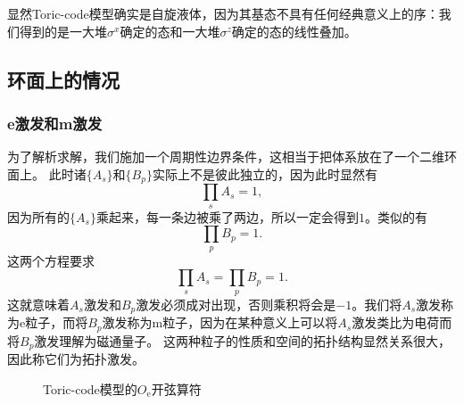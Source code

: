 显然Toric-code模型确实是自旋液体，因为其基态不具有任何经典意义上的序：我们得到的是一大堆$\sigma^x$确定的态和一大堆$\sigma^z$确定的态的线性叠加。

\subsection{环面上的情况}

\subsubsection{e激发和m激发}

为了解析求解，我们施加一个周期性边界条件，这相当于把体系放在了一个二维环面上。
此时诸$\{A_s\}$和$\{B_p\}$实际上不是彼此独立的，因为此时显然有
\[
    \prod_s {A}_s = 1,
\]
因为所有的$\{A_s\}$乘起来，每一条边被乘了两边，所以一定会得到$1$。类似的有
\[
    \prod_p {B}_p = 1.
\]
这两个方程要求
\begin{equation}
    \prod_{s} A_s = \prod_{p} B_p = 1.
    \label{eq:toric-code-pair-condition}
\end{equation}
这就意味着$A_s$激发和$B_p$激发必须成对出现，否则乘积将会是$-1$。我们将$A_s$激发称为e粒子，而将$B_p$激发称为m粒子，因为在某种意义上可以将$A_s$激发类比为电荷而将$B_p$激发理解为磁通量子。
这两种粒子的性质和空间的拓扑结构显然关系很大，因此称它们为拓扑激发。

\begin{figure}
    \centering
    \caption{Toric-code模型的$O_\text{e}$开弦算符}
\end{figure}

